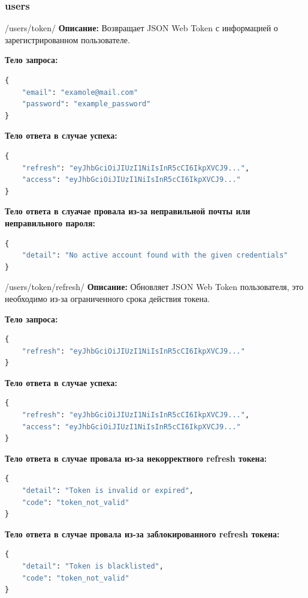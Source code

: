 \documentclass[a4paper,14pt]{extarticle}
\begin{document}
	\subsubsection{users}
	\begin{postapi}{/users/token/}
		\textbf{Описание:} Возвращает JSON Web Token с информацией о зарегистрированном пользователе.\medskip
		
		\textbf{Тело запроса:}
		\begin{lstlisting}[language=Python]
{
    "email": "examole@mail.com"
    "password": "example_password"
}
		\end{lstlisting}
		
		\textbf{Тело ответа в случае успеха:}
		\begin{lstlisting}[language=Python]
{
    "refresh": "eyJhbGciOiJIUzI1NiIsInR5cCI6IkpXVCJ9...",
    "access": "eyJhbGciOiJIUzI1NiIsInR5cCI6IkpXVCJ9..."
}
		\end{lstlisting}
		
		\textbf{Тело ответа в слуачае провала из-за неправильной почты или неправильного пароля:}
		\begin{lstlisting}[language=Python]
{
    "detail": "No active account found with the given credentials"
}
		\end{lstlisting}
	\end{postapi}
	
	\begin{postapi}{/users/token/refresh/}
		\textbf{Описание:} Обновляет JSON Web Token пользователя, это необходимо из-за ограниченного срока действия токена.\medskip
		
		\textbf{Тело запроса:}
		\begin{lstlisting}[language=Python]
{
    "refresh": "eyJhbGciOiJIUzI1NiIsInR5cCI6IkpXVCJ9..."
}
		\end{lstlisting}
		
		\textbf{Тело ответа в случае успеха:}
		\begin{lstlisting}[language=Python]
{
    "refresh": "eyJhbGciOiJIUzI1NiIsInR5cCI6IkpXVCJ9...",
    "access": "eyJhbGciOiJIUzI1NiIsInR5cCI6IkpXVCJ9..."
}
		\end{lstlisting}
		
		\textbf{Тело ответа в случае провала из-за некорректного refresh токена:}
		\begin{lstlisting}[language=Python]
{
    "detail": "Token is invalid or expired",
    "code": "token_not_valid"
}
		\end{lstlisting}
		
		\textbf{Тело ответа в случае провала из-за заблокированного refresh токена:}
		\begin{lstlisting}[language=Python]
{
    "detail": "Token is blacklisted",
    "code": "token_not_valid"
}
		\end{lstlisting}
	\end{postapi}
	
\end{document}
